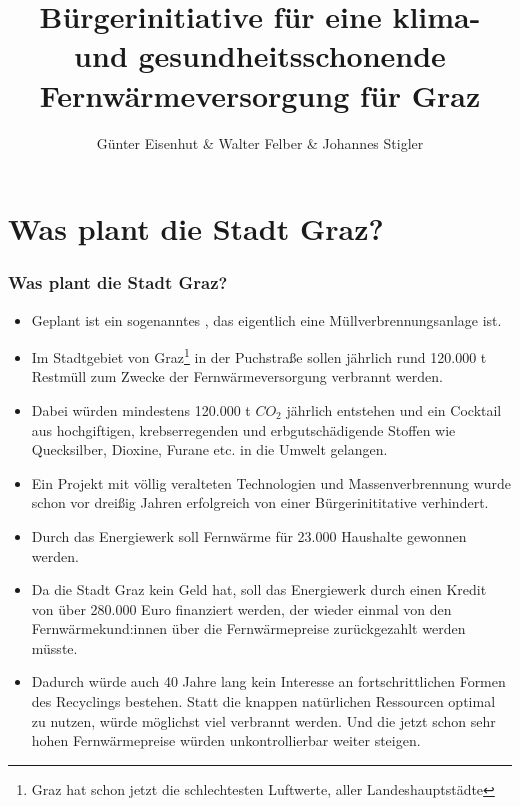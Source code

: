 \documentclass[8pt]{beamer}
\title[]{Bürgerinitiative für eine klima- und gesundheitsschonende Fernwärmeversorgung für Graz }
\subtitle{Günter Eisenhut \& Walter Felber \& Johannes Stigler}
\date[]{}
\begin{document}
	\frame{\titlepage}
		
	
	\section{Was plant die Stadt Graz?}
	\begin{frame}[t]
		\frametitle{Was plant die Stadt Graz?} 
		\begin{itemize}
			\item Geplant ist ein sogenanntes , das eigentlich eine Müllverbrennungsanlage ist.
			\item Im Stadtgebiet von Graz\footnote{Graz hat schon jetzt die schlechtesten Luftwerte, aller Landeshauptstädte} in der Puchstraße sollen jährlich rund 120.000 t Restmüll zum Zwecke der Fernwärmeversorgung verbrannt werden.
			\item Dabei würden mindestens 120.000 t $CO_2$ jährlich entstehen und ein Cocktail aus hochgiftigen, krebserregenden und erbgutschädigende Stoffen wie Quecksilber, Dioxine, Furane etc. in die Umwelt gelangen.
			\item Ein Projekt mit völlig veralteten Technologien und Massenverbrennung wurde schon vor dreißig Jahren erfolgreich von einer Bürgerinititative verhindert. 			
			
			\item Durch das Energiewerk soll Fernwärme für 23.000 Haushalte gewonnen werden. 
			\item Da die Stadt Graz kein Geld hat, soll das Energiewerk durch einen Kredit von über 280.000 Euro finanziert werden, der wieder einmal von den Fernwärmekund:innen über die Fernwärmepreise zurückgezahlt werden müsste.
			
			\item Dadurch würde auch 40 Jahre lang kein Interesse an fortschrittlichen Formen des Recyclings bestehen. Statt die knappen natürlichen Ressourcen optimal zu nutzen, würde möglichst viel verbrannt werden. Und die jetzt schon sehr hohen Fernwärmepreise würden unkontrollierbar weiter steigen.
  		\end{itemize}
	\end{frame}
	
\end{document}
